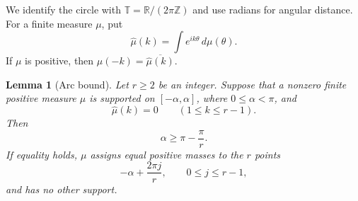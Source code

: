 \documentclass[11pt]{article}
\newtheorem{lemma}[theorem]{Lemma}
\theoremstyle{definition}
\theoremstyle{remark}
\numberwithin{equation}{section}
\newcommand{\T}{\mathbb T}
\newcommand{\Z}{\mathbb Z}
\newcommand{\R}{\mathbb R}
\begin{document}
We identify the circle with $\T=\R/(2\pi\Z)$ and use radians for angular
distance. For a finite measure $\mu$, put
\[
 \widehat\mu(k)=\int e^{ik\theta}\,d\mu(\theta).
\]
If $\mu$ is positive, then
$\widehat\mu(-k)=\overline{\widehat\mu(k)}$.

\begin{lemma}[Arc bound]\label{lem:arc}
Let $r\ge2$ be an integer. Suppose that a nonzero finite positive measure
$\mu$ is supported on $[-\alpha,\alpha]$, where $0\le\alpha<\pi$, and
\begin{equation}\label{eq:moments}
 \widehat\mu(k)=0\qquad(1\le k\le r-1).
\end{equation}
Then
\begin{equation}\label{eq:arc-bound}
 \alpha\ge\pi-\frac\pi r.
\end{equation}
If equality holds, $\mu$ assigns equal positive masses to the $r$ points
\begin{equation}\label{eq:nodes}
 -\alpha+\frac{2\pi j}{r},\qquad 0\le j\le r-1,
\end{equation}
and has no other support.
\end{lemma}
\end{document}
